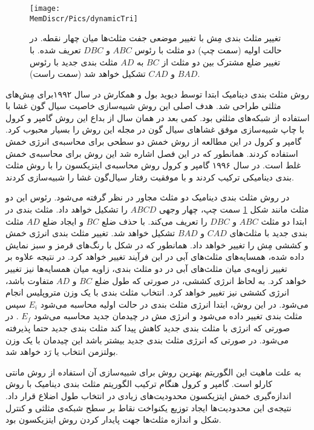 \begin{figure}[h]
\begin{center}
\texttt{[image: \\MemDiscr/Pics/dynamicTri]}
\caption{
تغییر مثلث بندی مِش با تغییر موضعی جفت مثلث‌ها میان چهار نقطه. در حالت اولیه (سمت چپ) دو مثلث با رئوس
$ABC$
و
$DBC$
تعریف شده. با تغییر ضلع مشترک بین دو مثلث از 
$BC$
به
$AD$
مثلث بندی جدید با رئوس
$BAD$
و 
$CAD$
تشکیل خواهد شد (سمت راست).
}
\label{fig:dynamicTri}
\end{center}
\end{figure}



روش  مثلث بندی دینامیک
ابتدا توسط دیوید بول
و همکارش 
\cite{Boal1992PRA}
در سال ۱۹۹۲برای مِش‌های مثلثی طراحی شد. هدف اصلی این روش شبیه‌سازی خاصیت سیال گون غشا با استفاده از شبکه‌های مثلثی بود. کمی‌ بعد در همان سال از بداع این روش گامپر و کرول با چاپ شبیه‌سازی موفق غشاهای سیال گون در مجله 
\cite{Gompper1992Science}
این روش را بسیار محبوب کرد. گامپر و کرول در این مطالعه از روش خمش دو سطحی برای محاسبه‌ی انرژی خمش استفاده کردند. همانطور که در این فصل اشاره شد این روش برای محاسبه‌ی خمش غلط است. در سال ۱۹۹۶ گامپر و کرول روش محاسبه‌ی ایتزیکسون را با روش مثلث بندی دینامیکی ترکیب کردند و با موفقیت رفتار سیال‌گون غشا را شبیه‌سازی کردند. 

در روش مثلث بندی دینامیک دو مثلث مجاور در نظر گرفته می‌شود. رئوس این دو مثلث مانند شکل 
\ref{fig:dynamicTri}
سمت چپ، چهار وجهی 
$ABCD$
را تشکیل خواهد داد. مثلث بندی در ابتدا دو مثلث 
$ABC$
و
$DBC$
را تعریف می‌کند. با حذف ضلع
$BC$
و ایجاد ضلع
$AD$
مثلث بندی جدید با مثلث‌های
$CAD$
و
$BAD$
تشکیل خواهد شد. تغییر مثلث بندی انرژی خمش و کششی مِش را تغییر خواهد داد. همانطور که در شکل با رنگ‌های قرمز و سبز نمایش داده شده، همسایه‌های مثلث‌های آبی در این فرآیند تغییر خواهد کرد. در نتیجه علاوه بر تغییر زاویه‌ی میان مثلث‌های آبی در دو مثلث بندی، زاویه میان همسایه‌ها نیز تغییر خواهد کرد. به لحاظ انرژی کششی، در صورتی که طول ضلع 
$BC$
و
$AD$
متفاوت باشد، انرژی کششی نیز تغییر خواهد کرد. انتخاب مثلث بندی با یک وزن متروپلیس انجام می‌شود. در این روش، ابتدا انرژی مثلث بندی در حالت اولیه محاسبه می‌شود
$E_i$
سپس مثلث بندی تغییر داده می‌شود و انرژی مش در چیدمان جدید محاسبه ‌می‌شود
$E_f$
. در صورتی که انرژی با مثلث بندی جدید کاهش پیدا کند مثلث بندی جدید حتما پذیرفته می‌شود. در صورتی که انرژی مثلث بندی جدید بیشتر باشد این چیدمان با یک وزن بولتزمن
انتخاب یا رَد خواهد شد. 

به علت ماهیت این الگوریتم بهترین روش برای شبیه‌سازی آن استفاده از روش مانتی کارلو
است. گامپر و کرول هنگام ترکیب الگوریتم مثلث بندی دینامیک با روش اندازه‌گیری خمش ایتزیکسون محدودیت‌های زیادی در انتخاب طول اضلاع قرار داد. نتیجه‌ی این محدودیت‌ها ایجاد توزیع یکنواخت نقاط بر سطح شبکه‌ی مثلثی و کنترل شکل و اندازه مثلث‌ها جهت پایدار کردن روش ایتزیکسون بود.
















